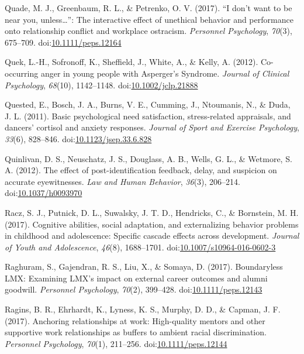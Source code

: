 \documentclass[english,man]{apa6}
\begin{document}
\hypertarget{ref-Quade2017}{}
Quade, M. J., Greenbaum, R. L., \& Petrenko, O. V. (2017). ``I don't
want to be near you, unless\ldots{}'': The interactive effect of
unethical behavior and performance onto relationship conflict and
workplace ostracism. \emph{Personnel Psychology}, \emph{70}(3),
675--709.
doi:\href{https://doi.org/10.1111/peps.12164}{10.1111/peps.12164}

\hypertarget{ref-Quek2012}{}
Quek, L.-H., Sofronoff, K., Sheffield, J., White, A., \& Kelly, A.
(2012). Co-occurring anger in young people with Asperger's Syndrome.
\emph{Journal of Clinical Psychology}, \emph{68}(10), 1142--1148.
doi:\href{https://doi.org/10.1002/jclp.21888}{10.1002/jclp.21888}

\hypertarget{ref-Quested2011}{}
Quested, E., Bosch, J. A., Burns, V. E., Cumming, J., Ntoumanis, N., \&
Duda, J. L. (2011). Basic psychological need satisfaction,
stress-related appraisals, and dancers' cortisol and anxiety responses.
\emph{Journal of Sport and Exercise Psychology}, \emph{33}(6), 828--846.
doi:\href{https://doi.org/10.1123/jsep.33.6.828}{10.1123/jsep.33.6.828}

\hypertarget{ref-Quinlivan2011}{}
Quinlivan, D. S., Neuschatz, J. S., Douglass, A. B., Wells, G. L., \&
Wetmore, S. A. (2012). The effect of post-identification feedback,
delay, and suspicion on accurate eyewitnesses. \emph{Law and Human
Behavior}, \emph{36}(3), 206--214.
doi:\href{https://doi.org/10.1037/h0093970}{10.1037/h0093970}

\hypertarget{ref-Racz2017}{}
Racz, S. J., Putnick, D. L., Suwalsky, J. T. D., Hendricks, C., \&
Bornstein, M. H. (2017). Cognitive abilities, social adaptation, and
externalizing behavior problems in childhood and adolescence: Specific
cascade effects across development. \emph{Journal of Youth and
Adolescence}, \emph{46}(8), 1688--1701.
doi:\href{https://doi.org/10.1007/s10964-016-0602-3}{10.1007/s10964-016-0602-3}

\hypertarget{ref-Raghuram2017}{}
Raghuram, S., Gajendran, R. S., Liu, X., \& Somaya, D. (2017).
Boundaryless LMX: Examining LMX's impact on external career outcomes and
alumni goodwill. \emph{Personnel Psychology}, \emph{70}(2), 399--428.
doi:\href{https://doi.org/10.1111/peps.12143}{10.1111/peps.12143}

\hypertarget{ref-Ragins2017}{}
Ragins, B. R., Ehrhardt, K., Lyness, K. S., Murphy, D. D., \& Capman, J.
F. (2017). Anchoring relationships at work: High-quality mentors and
other supportive work relationships as buffers to ambient racial
discrimination. \emph{Personnel Psychology}, \emph{70}(1), 211--256.
doi:\href{https://doi.org/10.1111/peps.12144}{10.1111/peps.12144}
\end{document}

